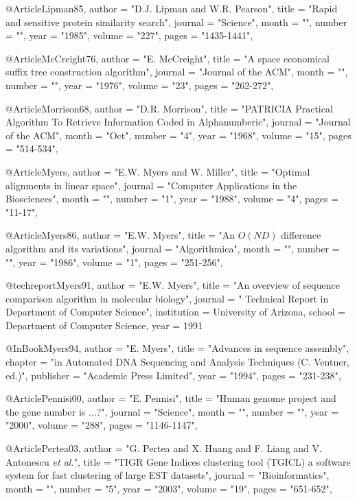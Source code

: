 @Article{Lipman85,
   author =   "D.J. Lipman and W.R. Pearson",
   title =   "Rapid and sensitive protein similarity search",
   journal =   "Science",
   month = "",
   number = "",
   year =   "1985",
   volume =   "227",
   pages =   "1435-1441",
}



@Article{McCreight76,
   author =   "E. McCreight",
   title =   "A space economical suffix tree construction algorithm",
   journal =   "Journal of the ACM",
   month = "",
   number = "",
   year =   "1976",
   volume =   "23",
   pages =   "262-272",
}

@Article{Morrison68,
   author =   "D.R. Morrison",
   title =   "\uppercase{PATRICIA} Practical Algorithm To Retrieve Information Coded
               in Alphanumberic",
   journal = "Journal of the ACM",
   month = "Oct",
   number = "4",
   year =   "1968",
   volume =   "15",
   pages =   "514-534",
}

@Article{Myers,
   author =   "E.W. Myers and W. Miller",
   title =   "Optimal alignments in linear space",
   journal =   "Computer Applications in the Biosciences",
   month = "",
   number = "1",
   year =   "1988",
   volume =   "4",
   pages =   "11-17",
}

@Article{Myers86,
   author =   "E.W. Myers",
   title =   "An $O(ND)$ difference algorithm and its variations",
   journal =   "Algorithmica",
   month = "",
   number = "",
   year =   "1986",
   volume =   "1",
   pages =   "251-256",
}

@techreport{Myers91,
   author =   "E.W. Myers",
   title =   "An overview of sequence comparison algorithm in molecular biology",
   journal =   " Technical Report in Department of Computer Science",
   institution = {University of Arizona},
   school = {Department of Computer Science},
   year = {1991}
}

@InBook{Myers94,
  author =   "E. Myers",
  title =    "Advances in sequence assembly",
  chapter =      "in Automated \uppercase{DNA} Sequencing and Analysis Techniques (C. Ventner, ed.)",
  publisher =    "Academic Press Limited",
  year =     "1994",
  pages =    "231-238",
}




@Article{Pennisi00,
   author =   "E. Pennisi",
   title =   "Human genome project and the gene number is ...?",
   journal =   "Science",
   month = "",
   number = "",
   year =   "2000",
   volume =   "288",
   pages =   "1146-1147",
}

@Article{Pertea03,
   author =   "G. Pertea and X. Huang and F. Liang and V. Antonescu {\it et al.}",
   title =   "\uppercase{TIGR} \uppercase{G}ene \uppercase{I}ndices clustering tool (\uppercase{TGICL}) a software system for fast clustering of large \uppercase{EST} datasets",
   journal = "Bioinformatics",
   month = "",
   number = "5",
   year =   "2003",
   volume =   "19",
   pages =   "651-652",
}


